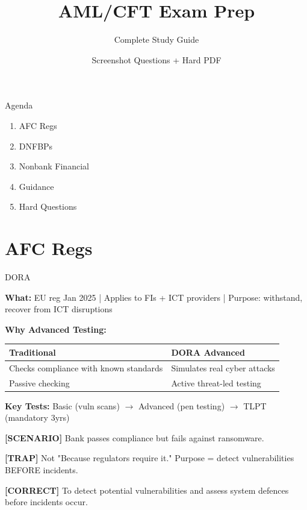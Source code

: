 \documentclass[8pt,aspectratio=169,fontsize=7pt]{beamer}
\renewcommand{\tiny}{\fontsize{4pt}{5pt}\selectfont}
\renewcommand{\small}{\fontsize{7pt}{8pt}\selectfont}
\renewcommand{\normalsize}{\fontsize{8pt}{9pt}\selectfont}
\renewcommand{\large}{\fontsize{9pt}{11pt}\selectfont}
\renewcommand{\Large}{\fontsize{11pt}{13pt}\selectfont}
\newcommand{\trap}[1]{%
	\begin{block}{\textcolor{redtrap}{\textbf{[TRAP]}}}
		\textcolor{redtrap}{\tiny #1}
	\end{block}
}
\newcommand{\scenario}[1]{%
	\begin{block}{\textbf{[SCENARIO]}}
		\tiny #1
	\end{block}
}
\newcommand{\correct}[1]{%
	\begin{block}{\textcolor{greencorrect}{\textbf{[CORRECT]}}}
		\textcolor{greencorrect}{\tiny #1}
	\end{block}
}
\begin{document}
	
	\begin{frame}
		\title{\Large AML/CFT Exam Prep}
		\subtitle{\normalsize Complete Study Guide}
		\author{\small Screenshot Questions + Hard PDF}
		\date{}
		\titlepage
	\end{frame}
	
	\begin{frame}{\large Agenda}
		\begin{enumerate}
			\item AFC Regs
			\item DNFBPs
			\item Nonbank Financial
			\item Guidance
			\item Hard Questions
		\end{enumerate}
	\end{frame}
	
	\section{AFC Regs}
	
	\begin{frame}{\normalsize DORA}
		
		\textbf{What:} EU reg Jan 2025 | Applies to FIs + ICT providers | Purpose: withstand, recover from ICT disruptions
		
		\textbf{Why Advanced Testing:}
		\begin{table}
			\begin{tabular}{|p{4cm}|p{4cm}|}
				\hline
				\textbf{Traditional} & \textbf{DORA Advanced} \\
				\hline
				Checks compliance with known standards & Simulates real cyber attacks \\
				\hline
				Passive checking & Active threat-led testing \\
				\hline
			\end{tabular}
		\end{table}
		
		\textbf{Key Tests:} Basic (vuln scans) $\to$ Advanced (pen testing) $\to$ TLPT (mandatory 3yrs)
		
		\scenario{Bank passes compliance but fails against ransomware.}
		
		\trap{Not "Because regulators require it." Purpose = detect vulnerabilities BEFORE incidents.}
		
		\correct{To detect potential vulnerabilities and assess system defences before incidents occur.}
	\end{frame}
	
\end{document}
